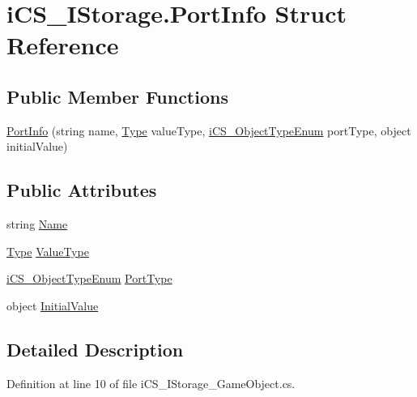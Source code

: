 \hypertarget{structi_c_s___i_storage_1_1_port_info}{\section{i\+C\+S\+\_\+\+I\+Storage.\+Port\+Info Struct Reference}
\label{structi_c_s___i_storage_1_1_port_info}
}
\subsection*{Public Member Functions}
\begin{DoxyCompactItemize}
\item 
\hyperlink{structi_c_s___i_storage_1_1_port_info_a5e14ed86f215d62182fc9c7be635e845}{Port\+Info} (string name, \hyperlink{i_c_s___object_type_enum_8cs_ae6c3dd6d8597380b56d94908eb431547aa1fa27779242b4902f7ae3bdd5c6d508}{Type} value\+Type, \hyperlink{i_c_s___object_type_enum_8cs_ae6c3dd6d8597380b56d94908eb431547}{i\+C\+S\+\_\+\+Object\+Type\+Enum} port\+Type, object initial\+Value)
\end{DoxyCompactItemize}
\subsection*{Public Attributes}
\begin{DoxyCompactItemize}
\item 
string \hyperlink{structi_c_s___i_storage_1_1_port_info_a410d56f4374863d1dcc39e10d6ca66dd}{Name}
\item 
\hyperlink{i_c_s___object_type_enum_8cs_ae6c3dd6d8597380b56d94908eb431547aa1fa27779242b4902f7ae3bdd5c6d508}{Type} \hyperlink{structi_c_s___i_storage_1_1_port_info_a2cd13d8721fa23ccd381ee8644402818}{Value\+Type}
\item 
\hyperlink{i_c_s___object_type_enum_8cs_ae6c3dd6d8597380b56d94908eb431547}{i\+C\+S\+\_\+\+Object\+Type\+Enum} \hyperlink{structi_c_s___i_storage_1_1_port_info_a88972b0dee64b6c2263c82783f56d853}{Port\+Type}
\item 
object \hyperlink{structi_c_s___i_storage_1_1_port_info_abbb8495437cec9939f7deea69af5c9f1}{Initial\+Value}
\end{DoxyCompactItemize}


\subsection{Detailed Description}


Definition at line 10 of file i\+C\+S\+\_\+\+I\+Storage\+\_\+\+Game\+Object.\+cs.



